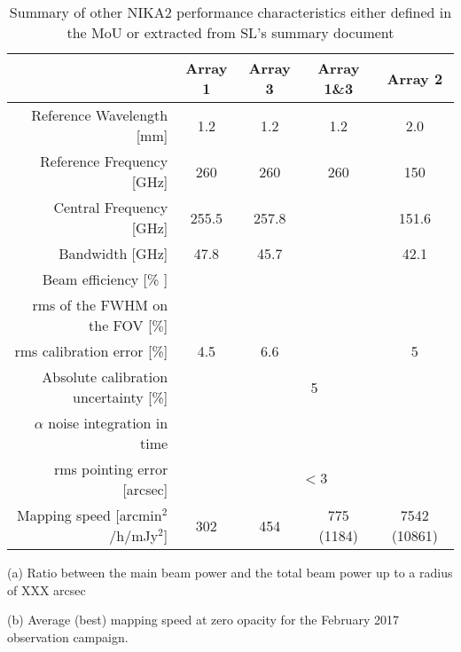 \begin{table}[h]
  \caption{Summary of other NIKA2 performance characteristics either defined in the MoU or extracted from SL's summary document}
  \label{nika2summary_second}
  \begin{threeparttable}
    \begin{tabular}{|r|c|c|c|c|}
      \hline
      & Array 1 & Array 3  & Array 1\&3 & Array 2 \\
      \hline
      \hline
      Reference Wavelength  [mm]  &  1.2   &  1.2  & 1.2 & 2.0   \\
      Reference Frequency  [GHz]  &  260   &  260  & 260 & 150  \\
      Central Frequency [GHz]     &  255.5  &    257.8     &     &   151.6  \\
      Bandwidth         [GHz]     &   47.8  &     45.7     &     &    42.1  \\
      \hline
      Beam efficiency\tnote{a}\hspace{1mm} [\% ]    &        &    &     &    \\
      rms of the FWHM on the FOV [$\%$]   &   &    &   &  \\
      \hline 
      rms calibration error [\%]            & 4.5  & 6.6  &   & 5  \\
      \hline
      Absolute calibration uncertainty [\%] &  \multicolumn{4}{|c|}{5} \\
      \hline
      $\alpha$ noise integration in time\tnote{d}\hspace{1mm}  &   &   &   &  \\
      \hline
      rms pointing error    [arcsec]    & \multicolumn{4}{|c|}{$<3$}  \\
      \hline
      Mapping speed\tnote{b}\hspace{1mm} [arcmin$^2$/h/mJy$^2$] & 302  & 454  & 775 (1184)  & 7542 (10861)  \\
\hline

\end{tabular}
  \begin{tablenotes}
  \item[(a)] Ratio between the main beam power and the total beam power up to a radius of XXX arcsec
  \item[(b)] Average (best) mapping speed at zero opacity for the February 2017 observation campaign. 
  \end{tablenotes}
\end{threeparttable}
\end{table}
